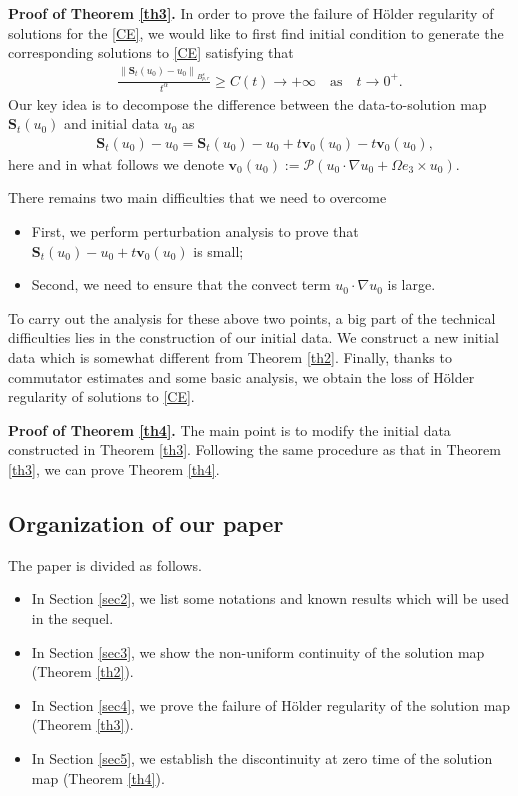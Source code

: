 \documentclass[12pt]{article}
\newcommand{\bbal}{\begin{align*}}
\newcommand{\na}{\nabla}
\newcommand{\cd}{\cdot}
\newcommand{\f}{\left}
\newcommand{\g}{\right}
\begin{document}
{\bf Proof of Theorem \ref{th3}.}  In order to prove the failure of H\"{o}lder regularity of solutions for the \eqref{CE}, we would like to first find initial condition to generate the corresponding solutions to \eqref{CE} satisfying that
\bbal
\frac{\f\|\mathbf{S}_t(u_0)-u_0\g\|_{B^s_{p,r}}}{t^\alpha}\geq C(t)\to+\infty\quad\text{as} \quad t\to 0^+.
\end{align*}
Our key idea is to decompose the  difference between the data-to-solution map $\mathbf{S}_t(u_0)$ and initial data $u_0$ as
\bbal
&\mathbf{S}_{t}(u_0)-u_0=\mathbf{S}_{t}(u_0)-u_0+t\mathbf{v}_0(u_0)-t\mathbf{v}_0(u_0),
\end{align*}
here and in what follows we denote $\mathbf{v}_0(u_0):=\mathcal{P}(u_0\cd\na u_0+\Omega e_3\times u_0)$.

There remains two main difficulties that we need to overcome
\begin{itemize}
\item First, we perform perturbation analysis to prove that $\mathbf{S}_{t}(u_0)-u_0+t\mathbf{v}_0(u_0)$ is small;
\item Second, we need to ensure that the convect term $u_0\cd\na u_0$ is large.
\end{itemize}
To carry out the analysis for these above two points, a big part of the technical difficulties lies in the construction of our initial data. We construct a new initial data which is somewhat different from Theorem \ref{th2}. Finally, thanks to commutator estimates and some basic analysis, we obtain the loss of H\"{o}lder regularity of solutions to \eqref{CE}.

{\bf Proof of Theorem \ref{th4}.} The main point is to modify the initial data constructed in Theorem \ref{th3}. Following the same procedure as that in Theorem \ref{th3}, we can prove Theorem \ref{th4}.

\subsection{Organization of our paper}

The paper is divided as follows.
\begin{itemize}
  \item In Section \ref{sec2}, we list some notations and known results which will be used in the sequel.
  \item In Section \ref{sec3}, we show the non-uniform continuity of the solution map (Theorem \ref{th2}).
  \item In Section \ref{sec4}, we prove the failure of H\"{o}lder regularity of the solution map (Theorem \ref{th3}).
  \item In Section \ref{sec5}, we establish the discontinuity at zero time of the solution map (Theorem \ref{th4}).
\end{itemize}
\end{document}
